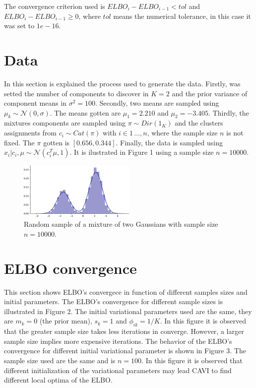 \documentclass{article}
\begin{document}
The convergence criterion used is $ELBO_{i}-ELBO_{i-1}<tol$ and $ELBO_{i}-ELBO_{i-1}\geq 0$, where $tol$ means the numerical tolerance, in this case it was set to $1e-16$. 

\section{Data}

In this section is explained the process used to generate the data. Firstly, was setted the number of components to discover in $K=2$ and the prior variance of component means in $\sigma^{2}=100$. Secondly, two means are sampled using $\mu_{k}\sim \mathcal{N}(0, \sigma)$. The means gotten are $\mu_{1}=2.210$ and $\mu_{2}=-3.405$. Thirdly, the mixtures components are sampled using $\pi\sim Dir(1_{K})$ and the clusters assignments from $c_{i}\sim Cat(\pi)$ with $i \in {1\,\ldots, n}$, where the sample size $n$ is not fixed. The $\pi$ gotten is $[0.656, 0.344]$. Finally, the data is sampled using $x_{i}|c_{i}, \mu \sim \mathcal{N}(c_{i}^{T}\mu, 1)$. It is ilustrated in Figure 1 using a sample size $n=10000$. 

\begin{figure}[!h]
    \includegraphics[width=0.5\textwidth]{img/data.pdf} 
    \caption{Random sample of a mixture of two Gaussians with sample size $n=10000$.}
\end{figure}

\section{ELBO convergence}

This section shows ELBO's convergece in function of different samples sizes and initial parameters. The ELBO's convergence for different sample sizes is illustrated in Figure 2. The initial variational parameters used are the same, they are $m_{k} = 0$ (the prior mean), $s_{k}=1$ and $\phi_{ik}=1/K$. In this figure it is observed that the greater sample size takes less iterations in converge. However, a larger sample size implies more expensive iterations. The behavior of the ELBO's convergence for different initial variational parameter is shown in Figure 3. The sample size used are the same and is $n=100$. In this figure it is observed that different initialization of the variational parameters may lead CAVI to find different local optima of the ELBO.
\end{document}
